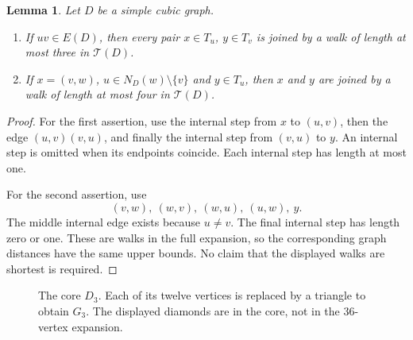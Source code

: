 \documentclass[11pt,a4paper]{article}
\newtheorem{lemma}[theorem]{Lemma}
\theoremstyle{definition}
\theoremstyle{remark}
\newcommand{\E}{E}
\newcommand{\NN}{N}
\newcommand{\Exp}{\mathcal{T}}
\begin{document}
\begin{lemma}\label{lem:metric}
Let \(D\) be a simple cubic graph.
\begin{enumerate}
\item If \(uv\in\E(D)\), then every pair \(x\in T_u\), \(y\in T_v\)
is joined by a walk of length at most three in \(\Exp(D)\).
\item If \(x=(v,w)\), \(u\in\NN_D(w)\setminus\{v\}\) and
\(y\in T_u\), then \(x\) and \(y\) are joined by a walk of length
at most four in \(\Exp(D)\).
\end{enumerate}
\end{lemma}

\begin{proof}
For the first assertion, use the internal step from \(x\) to
\((u,v)\), then the edge \((u,v)(v,u)\), and finally the internal
step from \((v,u)\) to \(y\). An internal step is omitted when its
endpoints coincide. Each internal step has length at most one.

For the second assertion, use
\begin{equation}\label{eq:fourwalk}
 (v,w),\ (w,v),\ (w,u),\ (u,w),\ y.
\end{equation}
The middle internal edge exists because \(u\ne v\). The final
internal step has length zero or one. These are walks in the full
expansion, so the corresponding graph distances have the same upper
bounds. No claim that the displayed walks are shortest is required.
\end{proof}

\begin{figure}[htbp]
\centering
{}
\caption{The core \(D_3\). Each of its twelve vertices is replaced by
a triangle to obtain \(G_3\). The displayed diamonds are in the core,
not in the 36-vertex expansion.}\label{fig:core}
\end{figure}
\end{document}
